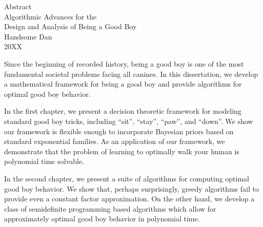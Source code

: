 \begin{center}
	Abstract\\
	Algorithmic Advances for the  \\ Design and Analysis of Being a Good Boy \\
	Handsome Dan \\
	20XX
\end{center}

\begin{spacing}{2}
	
Since the beginning of recorded history, being a good boy is one of the most fundamental societal problems facing all canines.
In this dissertation, we develop a mathematical framework for being a good boy and provide algorithms for optimal good boy behavior.

In the first chapter, we present a decision theoretic framework for modeling standard good boy tricks, including ``sit'', ``stay'', ``paw'', and ``down''.
We show our framework is flexible enough to incorporate Bayesian priors based on standard exponential families.
As an application of our framework, we demonstrate that the problem of learning to optimally walk your human is polynomial time solvable.

In the second chapter, we present a suite of algorithms for computing optimal good boy behavior.
We show that, perhaps surprisingly, greedy algorithms fail to provide even a constant factor approximation.
On the other hand, we develop a class of semidefinite programming based algorithms which allow for approximately optimal good boy behavior in polynomial time.
	 

\end{spacing}

